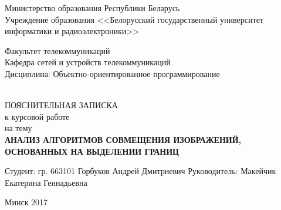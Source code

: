 \begin{titlepage}
  \begin{center}
    Министерство образования Республики Беларусь\\[0.4em]
    Учреждение образования <<Белорусский государственный университет информатики и радиоэлектроники>>\\[3.5em]

    \begin{minipage}{\textwidth}
      \begin{flushleft}
          Факультет телекоммуникаций\\[1em]

          Кафедра сетей и устройств телекоммуникаций\\[1em]

          Дисциплина: Объектно-ориентированное программирование
      \end{flushleft}
    \end{minipage}\\[3em]

    {ПОЯСНИТЕЛЬНАЯ ЗАПИСКА}\\
    {к курсовой работе}\\
    {на тему}\\[1em]
    \textbf{\MakeTextUppercase{АНАЛИЗ АЛГОРИТМОВ СОВМЕЩЕНИЯ ИЗОБРАЖЕНИЙ, ОСНОВАННЫХ НА ВЫДЕЛЕНИИ ГРАНИЦ}}\\[1em]



    \vspace{8em}

    \begin{flushright}
        \begin{minipage}{0.7\textwidth}
            Студент:  гр. 663101 Горбуков Андрей Дмитриевич 
            Руководитель: Макейчик Екатерина Геннадьевна 
        \end{minipage}
    \end{flushright}

    \vfill
    {\normalsize Минск 2017}
  \end{center}
\end{titlepage}

